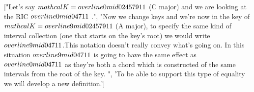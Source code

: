 \documentclass[preview]{standalone}
\begin{document}
\begin{center}
["Let's say $\\mathcal{K} =  \\overline{0} \\mid 0 2 4 5 7 9 11$ (C major) and we are looking at the RIC $\\overline{0} \\mid 0 4 7 11$ .", "Now we change keys and we're now in the key of $ \\mathcal{K} =  \\overline{9} \\mid 0 2 4 5 7 9 11$ (A major), to specify the same kind of interval collection (one that starts on the key's root) we would write $ \\overline{9} \\mid 0 4 7 11$.This notation doesn't really convey what's going on. In this situation $ \\overline{9} \\mid 0 4 7 11$ is going to have the same effect as $ \\overline{0} \\mid 0 4 7 11$ as they're both a chord which is constructed of the same intervals from the root of the key. ", 'To be able to support this type of equality we will develop a new definition.']
\end{center}
\end{document}
